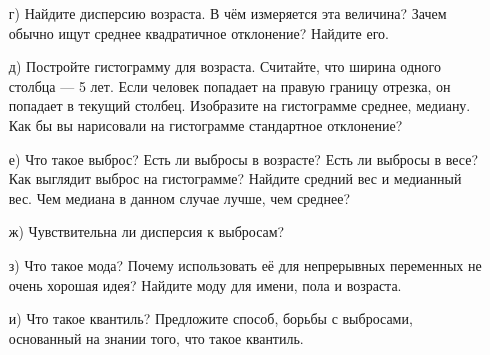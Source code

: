 \documentclass[12pt, a4paper, oneside]{article}
\theoremstyle{plain} %
\theoremstyle{definition}
\begin{document}
\begin{problem}
\begin{enumerate}
	\item[г)] Найдите дисперсию возраста. В чём измеряется эта величина? Зачем обычно ищут среднее квадратичное отклонение? Найдите его. 	
	
	\item[д)]  Постройте гистограмму для возраста. Считайте, что ширина одного столбца --- 5 лет. Если человек попадает на правую границу отрезка, он попадает в текущий столбец.  Изобразите на гистограмме среднее, медиану. Как бы вы нарисовали на гистограмме стандартное отклонение? 
	
	\item[е)] Что такое выброс? Есть ли выбросы в возрасте? Есть ли выбросы в весе? Как выглядит выброс на гистограмме? Найдите средний вес и медианный вес. Чем медиана в данном случае лучше, чем среднее?
	
	\item[ж)] Чувствительна ли дисперсия к выбросам?
	
	\item[з)] Что такое мода? Почему использовать её для непрерывных переменных не очень хорошая идея? Найдите моду для имени, пола и возраста.
	
	\item[и)]  Что такое квантиль? Предложите способ,  борьбы с выбросами, основанный на знании того, что такое квантиль.
\end{enumerate}
\end{problem}
\end{document}

